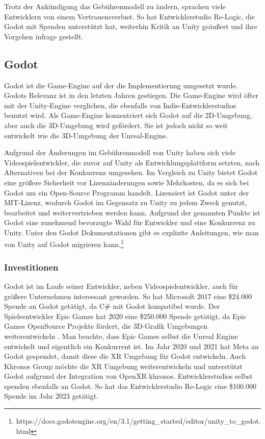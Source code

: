 Trotz der Ank\"{u}ndigung das Geb\"{u}hrenmodell zu \"{a}ndern, sprachen viele Entwicklern von einem Vertrauensverlust. So hat Entwicklerstudio Re-Logic, die Godot mit Spenden unterst\"{u}tzt hat, weiterhin Kritik an Unity ge\"{a}u\ss{}ert und ihre Vorgehen infrage gestellt.\autocite{golem3}

\subsection{Godot}
\label{chap:sota godot}

Godot ist die Game-Engine auf der die Implementierung umgesetzt wurde. Godots Relevanz ist in den letzten Jahren gestiegen. Die Game-Engine wird \"{o}fter mit der Unity-Engine verglichen, die ebenfalls von Indie-Entwicklerstudios benutzt wird. Als Game-Engine konzentriert sich Godot auf die 2D-Umgebung, aber auch die 3D-Umgebung wird gef\"{o}rdert. Sie ist jedoch nicht so weit entwickelt wie die 3D-Umgebung der Unreal-Engine.

Aufgrund der \"{A}nderungen im Geb\"{u}hrenmodell von Unity haben sich viele Videospielentwickler, die zuvor auf Unity als Entwicklungsplattform setzten, nach Alternativen bei der Konkurrenz umgesehen. Im Vergleich zu Unity bietet Godot eine gr\"{o}\ss{}ere Sicherheit vor Lizenz\"{a}nderungen sowie Mehrkosten, da es sich bei Godot um ein Open-Source Programm handelt. Lizensiert ist Godot unter der MIT-Lizenz, wodurch Godot im Gegensatz zu Unity zu jedem Zweck genutzt, bearbeitet und weitervertrieben werden kann. \autocite{golem4} Aufgrund der genannten Punkte ist Godot eine zunehmend bevorzugte Wahl f\"{u}r Entwickler und eine Konkurrenz zu Unity. Unter den Godot Dokumentationen gibt es explizite Anleitungen, wie man von Unity auf Godot migrieren kann.\footnote{https://docs.godotengine.org/en/3.1/getting_started/editor/unity_to_godot.html}

\subsubsection{Investitionen}
\label{chap:godot investitionen}

Godot ist im Laufe seiner Entwickler, neben Videospielentwickler, auch f\"{u}r gr\"{o}\ss{}ere Unternehmen interessant geworden. So hat Microsoft 2017 eine \$24.000 Spende an Godot get\"{a}tigt, da C# mit Godot kompatibel wurde. Der Spieleentwickler Epic Games hat 2020 eine \$250.000 Spende get\"{a}tigt, da Epic Games OpenSource Projekte f\"{o}rdert, die 3D-Grafik Umgebungen weiterentwickeln \autocite{megagrant}. Man beachte, dass Epic Games selbst die Unreal Engine entwickelt und eigentlich ein Konkurrent ist. Im Jahr 2020 und 2021 hat Meta an Godot gespendet, damit diese die XR Umgebung f\"{u}r Godot entwickeln. Auch Khronos Group m\"{o}chte die XR Umgebung weiterentwickeln und unterst\"{u}tzt Godot aufgrund der Integration von OpenXR khronos. Entwicklerstudios selbst spenden ebenfalls an Godot. So hat das Entwicklerstudio Re-Logic eine \$100.000 Spende im Jahr 2023 get\"{a}tigt. \autocite{gdfd2023} 

